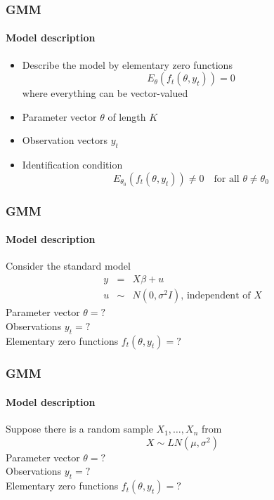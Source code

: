 \documentclass{beamer}
\begin{document}
\begin{frame}\frametitle{GMM}\framesubtitle{Model description}
\begin{itemize}
    \item Describe the model by elementary zero functions%
    \begin{equation*}
    E_{\theta }\left( f_{t}\left( \theta ,y_{t}\right) \right) =0
    \end{equation*}%
    where everything can be vector-valued
    \item Parameter vector $\theta $ of length $K$
    \item Observation vectors $y_{t}$
    \item Identification condition
    \begin{equation*}
    E_{\theta _{0}}\left( f_{t}\left( \theta ,y_{t}\right) \right) \neq 0\quad \text{for all }\theta \neq \theta _{0}
    \end{equation*}
\end{itemize}
\end{frame}


\begin{frame}\frametitle{GMM}\framesubtitle{Model description}
\begin{example}
    Consider the standard model
    \begin{eqnarray*}
    y &=&X\beta +u \\
    u &\sim &N(0,\sigma ^{2}I)\text{, independent of }X
    \end{eqnarray*}
    Parameter vector $\theta =?$\\ %
    Observations $y_{t}=?$\\ %
    Elementary zero functions $f_{t}(\theta ,y_{t})=?$ %
\end{example}
\end{frame}


\begin{frame}\frametitle{GMM}\framesubtitle{Model description}
\begin{example}
    Suppose there is a random sample $X_{1},\ldots ,X_{n}$ from
    \begin{equation*}
    X\sim LN(\mu ,\sigma ^{2})
    \end{equation*}
    Parameter vector $\theta =?$\\ %
    Observations $y_{t}=?$\\ %
    Elementary zero functions $f_{t}(\theta ,y_{t})=?$ %
\end{example}
\end{frame}
\end{document}
